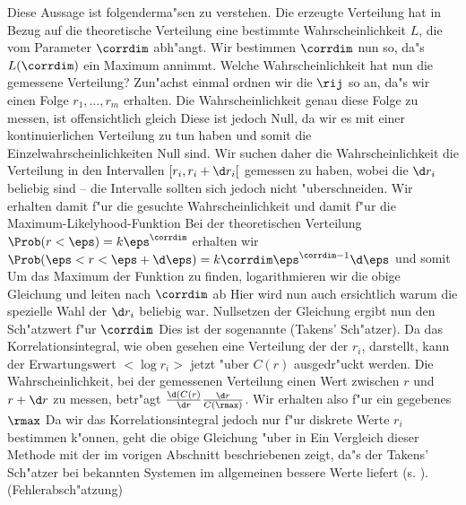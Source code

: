 Diese Aussage ist folgenderma"sen zu verstehen. Die erzeugte Verteilung hat in Bezug auf
die theoretische Verteilung eine bestimmte Wahrscheinlichkeit $L$, die vom Parameter
$\corrdim$ abh"angt. Wir bestimmen $\corrdim$ nun so, da"s $L(\corrdim)$ ein Maximum
annimmt. Welche Wahrscheinlichkeit hat nun die gemessene Verteilung? Zun"achst einmal
ordnen wir die $\rij$ so an, da"s wir einen Folge $r_1,\dots,r_m$ erhalten. Die
Wahrscheinlichkeit genau diese Folge zu messen, ist offensichtlich gleich
Diese ist jedoch Null, da wir es mit einer kontinuierlichen Verteilung zu tun haben und
somit die Einzelwahrscheinlichkeiten Null sind. Wir suchen daher die Wahrscheinlichkeit
die Verteilung in den Intervallen $[r_i,r_i+\d r_i[$ gemessen zu haben, wobei die $\d r_i$ 
beliebig sind -- die Intervalle sollten sich jedoch nicht "uberschneiden. Wir erhalten
damit f"ur die gesuchte Wahrscheinlichkeit und damit f"ur die Maximum-Likelyhood-Funktion
Bei der theoretischen Verteilung $\Prob(r<\eps)=k\eps^\corrdim$ erhalten wir 
$\Prob(\eps<r<\eps+\d\eps)=k\corrdim\eps^{\corrdim-1}\d\eps$ und somit
Um das Maximum der Funktion zu finden, logarithmieren wir die obige Gleichung und leiten
nach $\corrdim$ ab
Hier wird nun auch ersichtlich warum die spezielle Wahl der $\d r_i$ beliebig
war. Nullsetzen der Gleichung ergibt nun den Sch"atzwert f"ur $\corrdim$
Dies ist der sogenannte \begriff(Takens' Sch"atzer). Da das Korrelationsintegral, wie oben 
gesehen eine Verteilung der der $r_i$, darstellt, kann der Erwartungswert $<\log r_i>$
jetzt "uber $C(r)$ ausgedr"uckt werden. Die Wahrscheinlichkeit, bei der gemessenen
Verteilung einen Wert zwischen $r$ und $r+\d r$ zu messen, betr"agt $\frac{\d (C(r)}{\d
r}\frac{\d r}{C(\rmax)}$. Wir erhalten also f"ur ein gegebenes $\rmax$
Da wir das Korrelationsintegral jedoch nur f"ur diskrete Werte $r_i$ bestimmen k"onnen,
geht die obige Gleichung "uber in
Ein Vergleich dieser Methode mit der im vorigen Abschnitt beschriebenen zeigt, da"s der
Takens' Sch"atzer bei bekannten Systemen im allgemeinen bessere Werte liefert (s. ).
\inkorrektur(Fehlerabsch"atzung)


